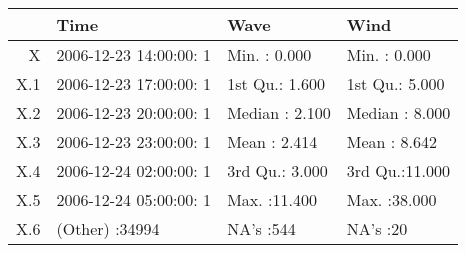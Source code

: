 \begin{table}[ht]
\centering
\begin{tabular}{rlll}
  \hline
 &                  Time &      Wave &      Wind \\ 
  \hline
X & 2006-12-23 14:00:00:    1   & Min.   : 0.000   & Min.   : 0.000   \\ 
  X.1 & 2006-12-23 17:00:00:    1   & 1st Qu.: 1.600   & 1st Qu.: 5.000   \\ 
  X.2 & 2006-12-23 20:00:00:    1   & Median : 2.100   & Median : 8.000   \\ 
  X.3 & 2006-12-23 23:00:00:    1   & Mean   : 2.414   & Mean   : 8.642   \\ 
  X.4 & 2006-12-24 02:00:00:    1   & 3rd Qu.: 3.000   & 3rd Qu.:11.000   \\ 
  X.5 & 2006-12-24 05:00:00:    1   & Max.   :11.400   & Max.   :38.000   \\ 
  X.6 & (Other)            :34994   & NA's   :544   & NA's   :20   \\ 
   \hline
\end{tabular}
\end{table}
